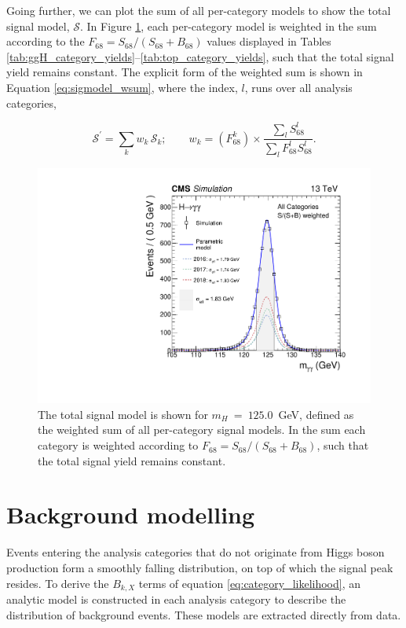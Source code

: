 Going further, we can plot the sum of all per-category models to show the total signal model, $\mathcal{S}$. In Figure \ref{fig:sigmodels_weighted}, each per-category model is weighted in the sum according to the $F_{68} = S_{68}/(S_{68}+B_{68})$ values displayed in Tables \ref{tab:ggH_category_yields}--\ref{tab:top_category_yields}, such that the total signal yield remains constant. The explicit form of the weighted sum is shown in Equation \ref{eq:sigmodel_wsum}, where the index, $l$, runs over all analysis categories,

\begin{equation}\label{eq:sigmodel_wsum}
    \mathcal{S}^' = \sum_k w_k\,\mathcal{S}_k; \qquad w_k = (F^k_{68}) \times \frac{\sum_l S^l_{68}}{\sum_l F^l_{68} S^l_{68}}.
\end{equation}

\begin{figure}[hbtp]
  \centering
  \includegraphics[width=.65\textwidth]{Figures/hgg_stats/smodel_all_weight.pdf}
  \caption[Weighted sum of all signal models]
  {
    The total signal model is shown for $m_H~=~125.0$~GeV, defined as the weighted sum of all per-category signal models. In the sum each category is weighted according to $F_{68}=S_{68}/(S_{68}+B_{68})$, such that the total signal yield remains constant.
  }
  \label{fig:sigmodels_weighted}
\end{figure}

\newpage
\section{Background modelling}\label{sec:bkg_modeling}
Events entering the analysis categories that do not originate from Higgs boson production form a smoothly falling \mgg distribution, on top of which the signal peak resides. To derive the $B_{k,X}$ terms of equation \ref{eq:category_likelihood}, an analytic model is constructed in each analysis category to describe the distribution of background events. These models are extracted directly from data.

